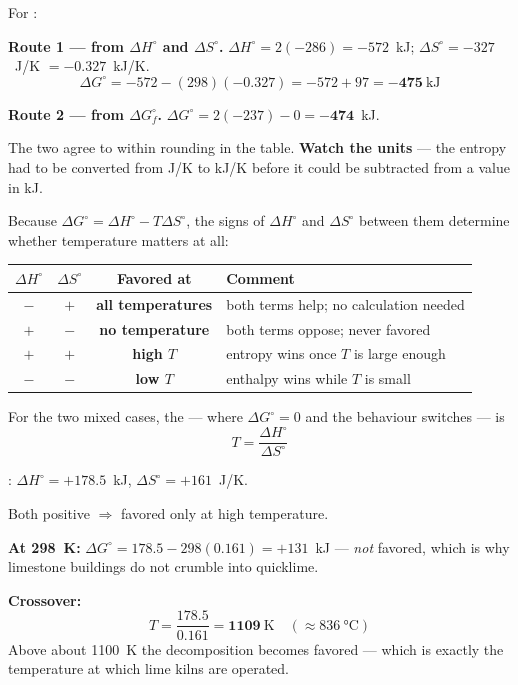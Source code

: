 \documentclass{apchem-notes}
\begin{document}
\begin{workedexample}
For :

\textbf{Route 1 --- from $\Delta H^\circ$ and $\Delta S^\circ$.}
$\Delta H^\circ = 2(-286) = -572$~kJ;
$\Delta S^\circ = -327$~J/K $= -0.327$~kJ/K.
\[ \Delta G^\circ = -572 - (298)(-0.327) = -572 + 97 = \mathbf{-475}~
   \text{kJ} \]

\textbf{Route 2 --- from $\Delta G_f^\circ$.}
$\Delta G^\circ = 2(-237) - 0 = \mathbf{-474}$~kJ.

The two agree to within rounding in the table. \textbf{Watch the units} ---
the entropy had to be converted from J/K to kJ/K before it could be
subtracted from a value in kJ.
\end{workedexample}



Because $\Delta G^\circ = \Delta H^\circ - T\Delta S^\circ$, the signs of
$\Delta H^\circ$ and $\Delta S^\circ$ between them determine whether
temperature matters at all:

\begin{center}
\begin{tabular}{@{}cccl@{}}
\hline
$\Delta H^\circ$ & $\Delta S^\circ$ & \textbf{Favored at} &
  \textbf{Comment} \\
\hline
$-$ & $+$ & \textbf{all temperatures} & both terms help; no calculation
  needed \\
$+$ & $-$ & \textbf{no temperature} & both terms oppose; never favored \\
$+$ & $+$ & \textbf{high $T$} & entropy wins once $T$ is large enough \\
$-$ & $-$ & \textbf{low $T$} & enthalpy wins while $T$ is small \\
\hline
\end{tabular}
\end{center}

For the two mixed cases, the  --- where
$\Delta G^\circ = 0$ and the behaviour switches --- is
\[ T = \frac{\Delta H^\circ}{\Delta S^\circ} \]

\begin{workedexample}
:
$\Delta H^\circ = +178.5$~kJ, $\Delta S^\circ = +161$~J/K.

Both positive $\Rightarrow$ favored only at high temperature.

\textbf{At \SI{298}{\kelvin}:}
$\Delta G^\circ = 178.5 - 298(0.161) = +131$~kJ --- \emph{not} favored, which
is why limestone buildings do not crumble into quicklime.

\textbf{Crossover:}
\[ T = \frac{178.5}{0.161} = \mathbf{1109}~\si{\kelvin}
   \quad (\approx \SI{836}{\celsius}) \]
Above about \SI{1100}{\kelvin} the decomposition becomes favored --- which is
exactly the temperature at which lime kilns are operated.
\end{workedexample}
\end{document}
